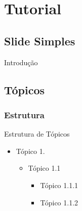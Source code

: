 \documentclass[aspectratio=169]{beamer}
\begin{document}
\newcommand{\autor}{Vinicius Takeo Friedrich Kuwaki}
\newcommand{\github}{github.com/takeofriedrich}
\newcommand{\email}{vinicius.kuwaki@edu.udesc.br}
\newcommand{\website}{}
\capa



\section{Tutorial}

\subsection{Slide Simples}

\begin{frame}{Introdução}
\lipsum[75]
\end{frame}


\subsection{Tópicos}
\subsubsection{Estrutura}

\begin{frame}{Estrutura de Tópicos}

    \begin{itemize}
        \item Tópico 1.
            \begin{itemize}
                \item Tópico 1.1
                    \begin{itemize}
                        \item Tópico 1.1.1
                        \item Tópico 1.1.2 
                    \end{itemize}
            \end{itemize}
    \end{itemize}
    
\end{frame}
\end{document}
